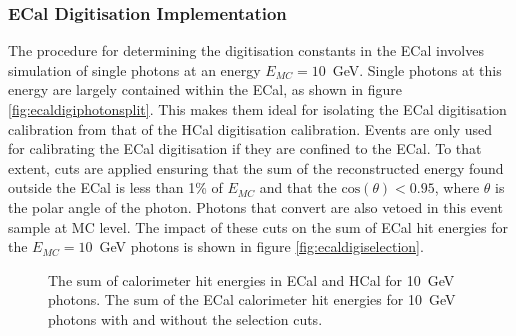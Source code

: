 
\subsubsection{ECal Digitisation Implementation}
\label{sec:ecaldigi}
The procedure for determining the digitisation constants in the ECal involves simulation of single photons at an energy $E_{MC} = 10$~GeV.  Single photons at this energy are largely contained within the ECal, as shown in figure \ref{fig:ecaldigiphotonsplit}.  This makes them ideal for isolating the ECal digitisation calibration from that of the HCal digitisation calibration.  Events are only used for calibrating the ECal digitisation if they are confined to the ECal.  To that extent, cuts are applied ensuring that the sum of the reconstructed energy found outside the ECal is less than 1\% of $E_{MC}$ and that the $\text{cos}(\theta) < 0.95$, where $\theta$ is the polar angle of the photon.  Photons that convert are also vetoed in this event sample at MC level.  The impact of these cuts on the sum of ECal hit energies for the $E_{MC} = 10$~GeV photons is shown in figure \ref{fig:ecaldigiselection}.

\begin{figure}[h!]
\caption[\protect{} The sum of calorimeter hit energies in ECal and HCal for 10~GeV photons.  \protect{} The sum of the ECal calorimeter hit energies for 10~GeV photons with and without the selection cuts.]{\protect{} The sum of calorimeter hit energies in ECal and HCal for 10~GeV photons.  \protect{} The sum of the ECal calorimeter hit energies for 10~GeV photons with and without the selection cuts.}
\label{fig:ecaldigi}
\end{figure}

